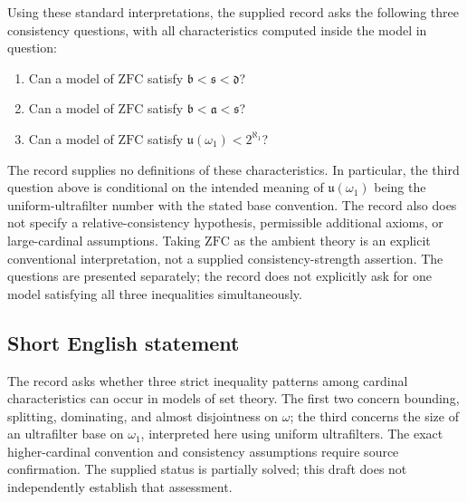 \documentclass[11pt]{article}
\begin{document}
Using these standard interpretations, the supplied record asks the following three consistency questions, with all characteristics computed inside the model in question:
\begin{enumerate}
\item Can a model of \(\mathrm{ZFC}\) satisfy \(\mathfrak b<\mathfrak s<\mathfrak d\)?
\item Can a model of \(\mathrm{ZFC}\) satisfy \(\mathfrak b<\mathfrak a<\mathfrak s\)?
\item Can a model of \(\mathrm{ZFC}\) satisfy \(\mathfrak u(\omega_1)<2^{\aleph_1}\)?
\end{enumerate}
The record supplies no definitions of these characteristics. In particular, the third question above is conditional on the intended meaning of \(\mathfrak u(\omega_1)\) being the uniform-ultrafilter number with the stated base convention. The record also does not specify a relative-consistency hypothesis, permissible additional axioms, or large-cardinal assumptions. Taking \(\mathrm{ZFC}\) as the ambient theory is an explicit conventional interpretation, not a supplied consistency-strength assertion. The questions are presented separately; the record does not explicitly ask for one model satisfying all three inequalities simultaneously.
\subsection{Short English statement}
The record asks whether three strict inequality patterns among cardinal characteristics can occur in models of set theory. The first two concern bounding, splitting, dominating, and almost disjointness on \(\omega\); the third concerns the size of an ultrafilter base on \(\omega_1\), interpreted here using uniform ultrafilters. The exact higher-cardinal convention and consistency assumptions require source confirmation. The supplied status is partially solved; this draft does not independently establish that assessment.
\end{document}
